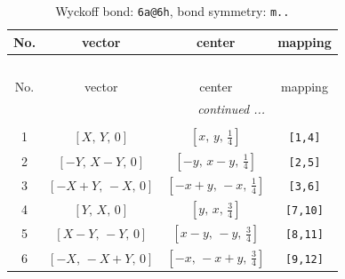 \documentclass[fleqn,8pt]{jsarticle}
\begin{document}
\renewcommand{\arraystretch}{1.2}
\begin{longtable}{cccc}
\caption{Wyckoff bond: {\tt 6a@6h}, bond symmetry: {\tt m..}}
 \\
 \hline \hline
No. & vector & center & mapping \\ \hline \endfirsthead

\multicolumn{3}{l}{\tablename\ \thetable{}} \\
 \hline \hline
No. & vector & center & mapping \\ \hline \endhead

 \hline \hline
\multicolumn{3}{r}{\footnotesize\it continued ...} \\ \endfoot

 \hline \hline
\multicolumn{3}{r}{} \\ \endlastfoot

1 & $\left[ X,\, Y,\, 0 \right]$ & $\left[ x,\, y,\, \frac{1}{4} \right]$ & {\tt [1,4]} \\ \hline
2 & $\left[ - Y,\, X - Y,\, 0 \right]$ & $\left[ - y,\, x - y,\, \frac{1}{4} \right]$ & {\tt [2,5]} \\ \hline
3 & $\left[ - X + Y,\, - X,\, 0 \right]$ & $\left[ - x + y,\, - x,\, \frac{1}{4} \right]$ & {\tt [3,6]} \\ \hline
4 & $\left[ Y,\, X,\, 0 \right]$ & $\left[ y,\, x,\, \frac{3}{4} \right]$ & {\tt [7,10]} \\ \hline
5 & $\left[ X - Y,\, - Y,\, 0 \right]$ & $\left[ x - y,\, - y,\, \frac{3}{4} \right]$ & {\tt [8,11]} \\ \hline
6 & $\left[ - X,\, - X + Y,\, 0 \right]$ & $\left[ - x,\, - x + y,\, \frac{3}{4} \right]$ & {\tt [9,12]} \\
\end{longtable}
\renewcommand{\arraystretch}{1.2}
\end{document}

